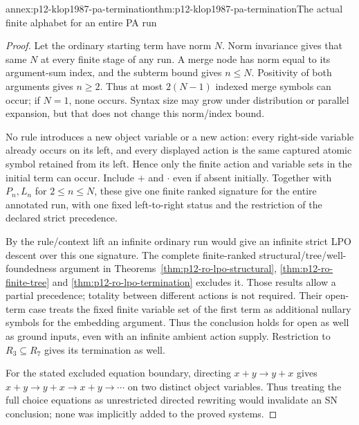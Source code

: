 \begin{annexitem}{annex:p12-klop1987-pa-termination}{thm:p12-klop1987-pa-termination}{The actual finite alphabet for an entire PA run}
\begin{proof}
Let the ordinary starting term have norm \(N\). Norm invariance
gives that same \(N\) at every finite stage of any run. A merge
node has norm equal to its argument-sum index, and the subterm
bound gives \(n\leq N\). Positivity of both arguments gives
\(n\geq2\). Thus at most \(2(N-1)\) indexed merge symbols
can occur; if \(N=1\), none occurs. Syntax size may grow under
distribution or parallel expansion, but that does not change
this norm/index bound.

No rule introduces a new object variable or a new action: every
right-side variable already occurs on its left, and every displayed
action is the same captured atomic symbol retained from its left.
Hence only the finite action and variable sets in the initial
term can occur. Include \(+\) and \(\cdot\) even if absent
initially. Together with \(P_n,L_n\) for \(2\leq n\leq N\),
these give one finite ranked signature for the entire annotated
run, with one fixed left-to-right status and the restriction of
the declared strict precedence.

By the rule/context lift an infinite ordinary run would give an
infinite strict LPO descent over this one signature. The complete
finite-ranked structural/tree/well-foundedness argument in
Theorems~\ref{thm:p12-ro-lpo-structural},
\ref{thm:p12-ro-finite-tree} and \ref{thm:p12-ro-lpo-termination}
excludes it. Those results allow a partial precedence; totality
between different actions is not required. Their open-term case
treats the fixed finite variable set of the first term as additional
nullary symbols for the embedding argument. Thus the conclusion
holds for open as well as ground inputs, even with an infinite
ambient action supply. Restriction to \(R_3\subseteq R_7\)
gives its termination as well.

For the stated excluded equation boundary, directing
\(x+y\to y+x\) gives
\(x+y\to y+x\to x+y\to\cdots\) on two distinct object
variables. Thus treating the full choice equations as unrestricted
directed rewriting would invalidate an SN conclusion; none was
implicitly added to the proved systems.
\end{proof}
\end{annexitem}

